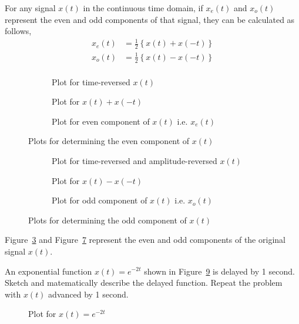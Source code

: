 \documentclass{article}[12 pt]
\begin{document}
\begin{solution}{
For any signal $x(t)$ in the continuous time domain, if $x_e(t)$ and $x_o(t)$ represent the even and odd components of that signal, they can be calculated as follows,
\begin{equation*}
\begin{aligned}
x_e(t)&=\frac{1}{2}\left\{x(t)+x(-t)\right\}\\
x_o(t)&=\frac{1}{2}\left\{x(t)-x(-t)\right\}\\
\end{aligned}
\end{equation*} 
\begin{figure}[H]
\begin{subfigure}{.5\textwidth}
  \centering
  \evengrapha
  \caption{Plot for time-reversed $x(t)$}
  \label{fig:even-first}
\end{subfigure}
\begin{subfigure}{.5\textwidth}
  \centering
  \evengraphb
  \caption{Plot for $x(t)+x(-t)$}
  \label{fig:even-second}
\end{subfigure}
\begin{subfigure}{\textwidth}
  \centering
  \evengraphc
  \caption{Plot for even component of $x(t)$ i.e. $x_e(t)$}
  \label{fig:even-third}
\end{subfigure}
\caption{Plots for determining the even component of $x(t)$}
\label{fig:evengraph}
\end{figure}
\begin{figure}[H]
\begin{subfigure}{.5\textwidth}
  \centering
  \oddgrapha
  \caption{Plot for time-reversed and amplitude-reversed $x(t)$}
  \label{fig:odd-first}
\end{subfigure}
\begin{subfigure}{.5\textwidth}
  \centering
  \oddgraphb
  \caption{Plot for $x(t)-x(-t)$}
  \label{fig:odd-second}
\end{subfigure}
\begin{subfigure}{\textwidth}
  \centering
  \oddgraphc
  \caption{Plot for odd component of $x(t)$ i.e. $x_o(t)$}
  \label{fig:odd-third}
\end{subfigure}
\caption{Plots for determining the odd component of $x(t)$}
\label{fig:oddgraph}
\end{figure}
Figure~\ref{fig:even-third} and Figure~\ref{fig:odd-third} represent the even and odd components of the original signal $x(t)$.
}\end{solution}
\begin{problem}
{An exponential function $x(t)=e^{-2t}$ shown in Figure~\ref{fig:qa} is delayed by 1 second. Sketch and matematically describe the delayed function. Repeat the problem with $x(t)$ advanced by 1 second.
\begin{figure}[H]
\centering
{}
\caption{Plot for $x(t)=e^{-2t}$}
\label{fig:qa}
\end{figure}
}
\end{problem}
\end{document}
